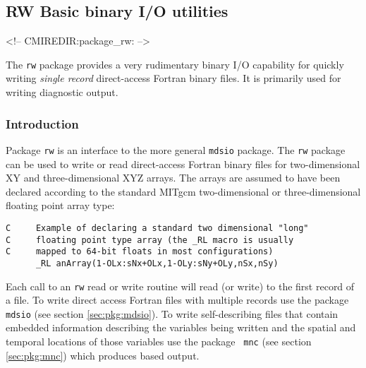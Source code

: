 

\subsection{RW Basic binary I/O utilities}
\label{sec:pkg:rw}
\begin{rawhtml}
<!-- CMIREDIR:package_rw: -->
\end{rawhtml}

The {\tt rw} package provides a very rudimentary binary I/O capability
for quickly writing {\it single record} direct-access Fortran binary files. 
It is primarily used for writing diagnostic output.

\subsubsection{Introduction}
Package {\tt rw} is an interface to the more general {\tt mdsio} package.
The {\tt rw} package can be used to write or read direct-access Fortran 
binary files for two-dimensional XY and three-dimensional XYZ arrays. 
The arrays are assumed to have been declared according to the standard
MITgcm two-dimensional or three-dimensional floating point array type:
\begin{verbatim}
C     Example of declaring a standard two dimensional "long" 
C     floating point type array (the _RL macro is usually 
C     mapped to 64-bit floats in most configurations)
      _RL anArray(1-OLx:sNx+OLx,1-OLy:sNy+OLy,nSx,nSy)
\end{verbatim}

Each call to an {\tt rw} read or write routine will read (or write) to
the first record of a file. To write direct access Fortran files with
multiple records use the package {\tt mdsio} (see section
\ref{sec:pkg:mdsio}).  To write self-describing files that contain
embedded information describing the variables being written and the
spatial and temporal locations of those variables use the package {\tt
  mnc} (see section \ref{sec:pkg:mnc}) which produces
\cite{rew:97} based output.


